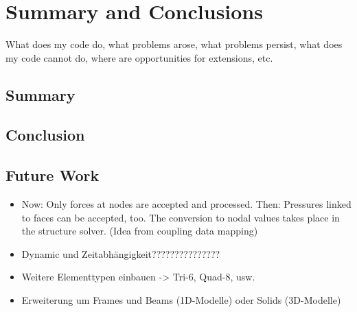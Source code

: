 \section{Summary and Conclusions}
What does my code do, what problems arose, what problems persist, what does my code cannot do, where are opportunities for extensions, etc.
 \subsection{Summary}
 
 \subsection{Conclusion}
 

 \subsection{Future Work}
  \begin{itemize}
  	\item Now: Only forces at nodes are accepted and processed. Then: Pressures linked to faces can be accepted, too. The conversion to nodal values takes place in the structure solver. (Idea from coupling data mapping)
  	\item Dynamic und Zeitabhängigkeit???????????????
  	\item Weitere Elementtypen einbauen -> Tri-6, Quad-8, usw.
  	\item Erweiterung um Frames und Beams (1D-Modelle) oder Solids (3D-Modelle)
  \end{itemize}
\newpage